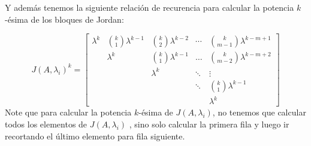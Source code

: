 \documentclass[12pt,a4paper]{article}
\begin{document}
Y además tenemos la siguiente relación de recurencia para calcular la potencia $k$-ésima de los bloques de Jordan:

$$J(A, \lambda_{i})^{k}=\begin{bmatrix}
\lambda^{k} & {k \choose 1}\lambda^{k-1}   & {k \choose 2}\lambda^{k-2} & \cdots       & {k \choose m-1}\lambda^{k-m+1}\\
& \lambda^{k}                &  {k \choose 1}\lambda^{k-1} & \dots       & {k \choose m-2}\lambda^{k-m+2}\\
&                            &  \lambda^{k}                & \ddots     &  \vdots\\                  &                            &                             & \ddots     & {k \choose 1}\lambda^{k-1}\\                  &                            &                             &             & \lambda^{k}
\end{bmatrix}$$
Note que para calcular la potencia $k$-ésima de $J(A,\lambda_{i})$, no tenemos que calcular todos los elementos de $J(A, \lambda_{i})$ , sino solo calcular la primera fila y luego ir recortando el último elemento para fila siguiente.
\end{document}
